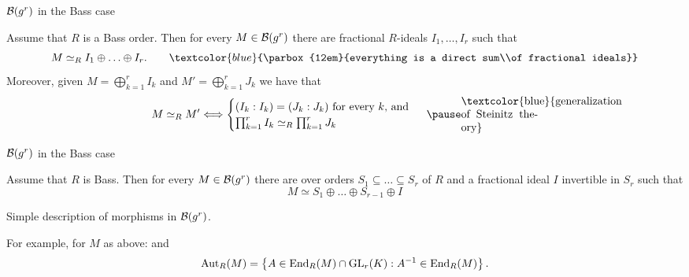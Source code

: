 \documentclass[usenames,dvipsnames,handout]{beamer}
\newcommand{\blue}[1]{\textcolor{blue}{#1}}
\begin{document}
\begin{frame}{ ${\mathcal B}(g^r)$ in the Bass case }
\begin{thm}[Bass]
 Assume that $R$ is a Bass order.
 \pause Then for every $M\in {\mathcal B}(g^r)$ there are fractional $R$-ideals $I_1,\ldots,I_r$ such that 
 \[ M \simeq_R I_1\oplus \ldots \oplus I_r. \qquad\blue{\parbox{12em}{everything is a direct sum\\of fractional ideals}}\]
 \pause Moreover, given $M=\bigoplus_{k=1}^r I_k$ and $M'=\bigoplus_{k=1}^r J_k$ we have that 
 \[ M\simeq_R M' \Longleftrightarrow
 \begin{cases}
  (I_k:I_k)=(J_k:J_k) \text{ for every $k$, and } \\
  \prod_{k=1}^r I_k \simeq_R \prod_{k=1}^r J_k
 \end{cases}
 \pause \parbox{7em}{\blue{generalization of Steinitz theory}}
 \]
\end{thm}
\end{frame}

\begin{frame}{ ${\mathcal B}(g^r)$ in the Bass case }
\begin{corollary}
 Assume that $R$ is Bass. Then for every $M\in {\mathcal B}(g^r)$ there are over orders $S_1\subseteq \ldots \subseteq S_r$ of $R$ and a fractional ideal $I$ invertible in $S_r$ such that
 \[ M\simeq S_1\oplus\ldots\oplus S_{r-1}\oplus I \]
\end{corollary}
  \pause Simple description of morphisms in ${\mathcal B}(g^r)$.

  For example, for $M$ as above:
  \pause {\small
\[ \End_R(M) = 
    \begin{pmatrix}
    S_1 	& S_2 	   & \ldots & S_{r-1} & I \\
    (S_1:S_2) 	& S_2 	   & \ldots & S_{r-1} & I \\
    \vdots 	& \vdots   & \ddots & \vdots  & \vdots \\
    (S_1:S_{r-1}) 	& (S_2:S_{r-1})& \ldots & S_{r-1} & I \\
    (S_1:I) 	& (S_2:I)& \ldots & (S_{r-1}:I) & (I:I)
    \end{pmatrix}
    \]
}
and 
\pause 
\[\operatorname{Aut}_R(M)=\left\lbrace A \in \operatorname{End}_R(M) \cap \operatorname{GL}_r(K) : A^{-1} \in \operatorname{End}_R(M) \right\rbrace.\]


\end{frame}
\end{document}
